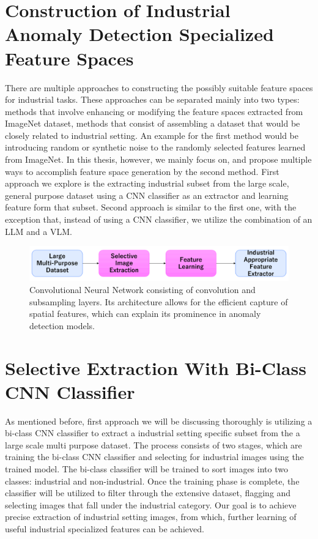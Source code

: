 \section{Construction of Industrial Anomaly Detection Specialized Feature Spaces}
\label{construction}
There are multiple approaches to constructing the possibly suitable feature spaces for industrial tasks. These approaches can be separated mainly into two types: methods that involve enhancing or modifying the feature spaces extracted from ImageNet dataset, methods that consist of assembling a dataset that would be closely related to industrial setting. An example for the first method would be introducing random or synthetic noise to the randomly selected features learned from ImageNet. In this thesis, however, we mainly focus on, and propose multiple ways to accomplish feature space generation by the second method. First approach we explore is the extracting industrial subset from the large scale, general purpose dataset using a CNN classifier as an extractor and learning feature form that subset. Second approach is similar to the first one, with the exception that, instead of using a CNN classifier, we utilize the combination of an LLM and a VLM.

\begin{figure}[t]
	\begin{center}
		\includegraphics[width=1.0\linewidth]{Chapter_3/selective_extraction.png}
	\end{center}
	\caption{Convolutional Neural Network consisting of convolution and subsampling layers. Its architecture allows for the efficient capture of spatial features, which can explain its prominence in anomaly detection models.}
	\label{fig:cnn}
\end{figure} 	

\section{Selective Extraction With Bi-Class CNN Classifier}
\label{cnn extraction}
As mentioned before, first approach we will be discussing thoroughly is utilizing a bi-class CNN classifier to extract a industrial setting specific subset from the a large scale multi purpose dataset. The process consists of two stages, which are training the bi-class CNN classifier and selecting for industrial images using the trained model. The bi-class classifier will be trained to sort images into two classes: industrial and non-industrial. Once the training phase is complete, the classifier will be utilized to filter through the extensive dataset, flagging and selecting images that fall under the industrial category. Our goal is to achieve precise extraction of industrial setting images, from which, further learning of useful industrial specialized features can be achieved. 

